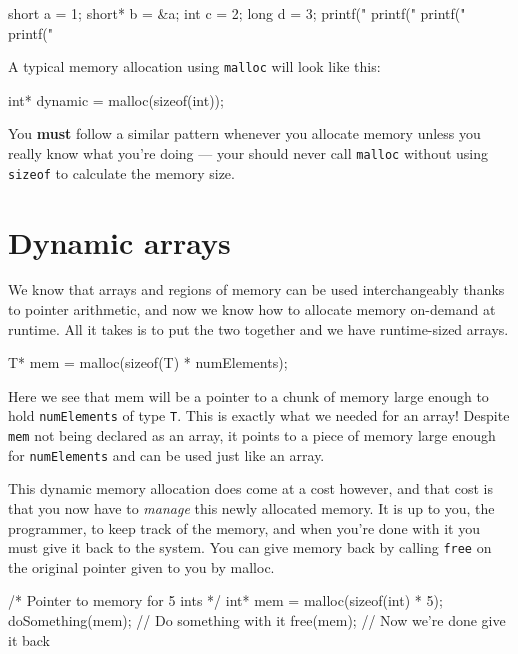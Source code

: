 \begin{codeblock}
short a = 1;
short* b = &a;
int c = 2;
long d = 3;
printf("%
printf("%
printf("%
printf("%
\end{codeblock}

A typical memory allocation using \lstinline!malloc! will look like this:
\begin{codeinline}
int* dynamic = malloc(sizeof(int));
\end{codeinline}

You \textbf{must} follow a similar pattern whenever you allocate memory unless you really know what you're doing --- your should 
never call \lstinline!malloc! without using \lstinline!sizeof! to calculate the memory size.

\section{Dynamic arrays}

We know that arrays and regions of memory can be used interchangeably thanks to pointer arithmetic, and now we know how to allocate memory on-demand at runtime.
All it takes is to put the two together and we have runtime-sized arrays.

\begin{codeinline}
T* mem = malloc(sizeof(T) * numElements);
\end{codeinline}

Here we see that mem will be a pointer to a chunk of memory large enough to hold \texttt{numElements} of type \texttt{T}.
This is exactly what we needed for an array!
Despite \lstinline!mem! not being declared as an array, it points to a piece of memory large enough for \lstinline!numElements! and can be used just like an array.

This dynamic memory allocation does come at a cost however, and that cost is that you now have to \emph{manage} this newly allocated memory.
It is up to you, the programmer, to keep track of the memory, and when you're done with it you must give it back to the system.
You can give memory back by calling \texttt{free} on the original pointer given to you by malloc.

\begin{codeblock}
/* Pointer to memory for 5 ints */
int* mem = malloc(sizeof(int) * 5);
doSomething(mem); // Do something with it
free(mem); // Now we're done give it back
\end{codeblock}

